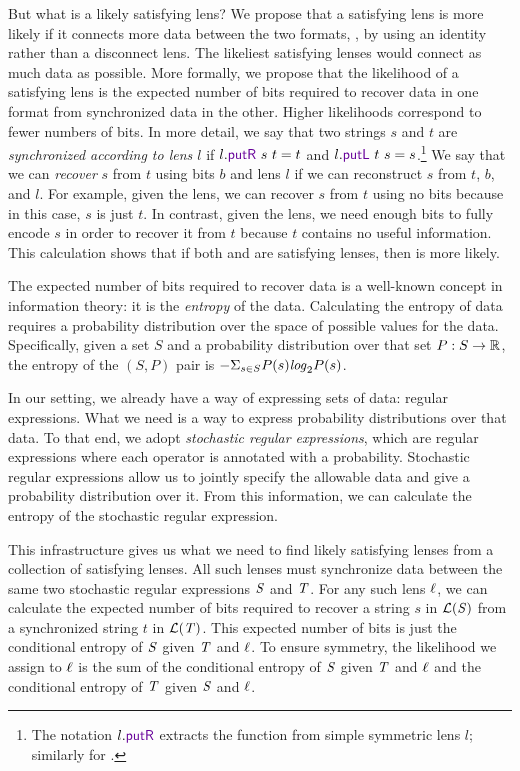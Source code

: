 \documentclass[acmsmall,screen,anonymous]{acmart}
\begin{document}
But what is a likely satisfying lens? We propose that a satisfying
lens is more likely if it connects more data between the two
formats, \IE, by using an identity rather than a disconnect lens.  The
likeliest satisfying lenses would connect as much data as
possible. More formally, we propose that the likelihood of a
satisfying lens is the expected number of bits required to recover
data in one format from synchronized data in the other.  Higher
likelihoods correspond to fewer numbers of bits. In more
detail, we say that two strings $s$ and $t$ are \emph{synchronized
according to lens $l$} if $l.\PutR\ s\ t = t$ and $l.\PutL\ t\ s = s$.\footnote{
The notation $l.\PutR$ extracts the \PutR function from simple
symmetric lens $l$; similarly for \PutL.}  We say that we
can \emph{recover} $s$ from $t$ using bits $b$ and lens $l$ if we can
reconstruct $s$ from $t$, $b$, and $l$.  For example, given
the \IdentityLens{} lens, we can recover $s$ from $t$ using no bits
because in this case, $s$ is just $t$.  In contrast, given
the \Disconnect{} lens, we need enough bits to fully encode $s$ in
order to recover it from $t$ because $t$ contains no useful
information.  This calculation shows that if both \IdentityLens{}
and \Disconnect{} are satisfying lenses, then \IdentityLens{} is more
likely.

The expected number of bits required to recover data is a
well-known concept in information theory: it is the \emph{entropy} of
the data. Calculating the 
entropy of data requires a probability distribution over the
space of possible values for the data.  Specifically,
given a set $S$ and a probability distribution over that set $P
: S \rightarrow \mathbb{R}$, the entropy of the $(S,P)$ pair is $-\Sigma_{s\in
  S}P(s)\mathit{log}_2P(s)$. 

In our setting, we already have a way of expressing sets of data:
regular expressions.  What we need is a way to express probability
distributions over that data.
To that end, we adopt \emph{stochastic regular expressions}, 
which are regular expressions where each operator is annotated with a
probability.  Stochastic regular expressions
allow us to jointly specify the allowable data and give a probability
distribution over it.  From this information, we can calculate the
entropy of the stochastic regular expression. 

This infrastructure gives us what we need to find likely
satisfying lenses from a collection of satisfying lenses.  All such
lenses must synchronize data between the same two 
stochastic regular expressions $\mathit{S}$ and $\mathit{T}$.
For any such lens $\mathit{\ell}$, we can calculate the expected number of
bits required 
to recover a string $s$ in $\mathcal{L}(\mathit{S})$ from a synchronized
string $t$ in $\mathcal{L}(\mathit{T})$. 
This expected number of bits is just the conditional entropy of
$\mathit{S}$ given $\mathit{T}$ and $\mathit{\ell}$. 
To ensure symmetry, the likelihood we assign to $\mathit{\ell}$ is the sum of 
the conditional entropy of $\mathit{S}$ given $\mathit{T}$ and $\mathit{\ell}$ and
the conditional entropy of $\mathit{T}$ given $\mathit{S}$ and $\mathit{\ell}$.
\end{document}
